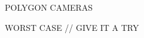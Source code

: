 \documentclass[nooutcomes,noauthor,hints]{ximera}
\begin{document}
\mynewpage


\begin{question} POLYGON CAMERAS
\end{question}

\mynewpage


\begin{question} WORST CASE // GIVE IT A TRY
\end{question}
\end{document}
